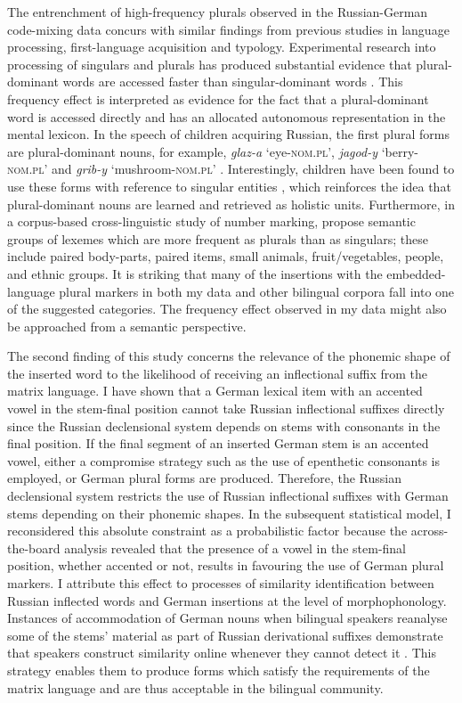 The entrenchment of high-frequency plurals observed in the Russian-German code-mixing data concurs with similar findings from previous studies in language processing, first-language acquisition and typology. Experimental research into processing of singulars and plurals has produced substantial evidence that plural-dominant words are accessed faster than singular-dominant words \citep{new-etal-2004,sereno-jongman-1997,baayen-dijkstra-schreuder}. This frequency effect is interpreted as evidence for the fact that a plural-dominant word is accessed directly and has an allocated autonomous representation in the mental lexicon. In the speech of children acquiring Russian, the first plural forms are plural-dominant nouns, for example, \textit{glaz-a} `eye-\textsc{nom.pl}', \textit{jagod-y} `berry-\textsc{nom.pl}' and \textit{grib-y} `mushroom-\textsc{nom.pl}' \citep[198]{gagarina-voeikova}. Interestingly, children have been found to use these forms with reference to singular entities \citep[91]{ceitlin}, which reinforces the idea that plural-dominant nouns are learned and retrieved as holistic units. Furthermore, in a corpus-based cross-linguistic study of number marking, \citet{haspelmath-karjus} propose semantic groups of lexemes which are more frequent as plurals than as singulars; these include paired body-parts, paired items, small animals, fruit/vegetables, people, and ethnic groups. It is striking that many of the insertions with the embedded-language plural markers in both my data and other bilingual corpora fall into one of the suggested categories. The frequency effect observed in my data might also be approached from a semantic perspective.

The second finding of this study concerns the relevance of the phonemic shape of the inserted word to the likelihood of receiving an inflectional suffix from the matrix language. I have shown that a German lexical item with an accented vowel in the stem-final position cannot take Russian inflectional suffixes directly since the Russian declensional system depends on stems with consonants in the final position. If the final segment of an inserted German stem is an accented vowel, either a compromise strategy such as the use of epenthetic consonants is employed, or German plural forms are produced. Therefore, the Russian declensional system restricts the use of Russian inflectional suffixes with German stems depending on their phonemic shapes. In the subsequent statistical model, I reconsidered this absolute constraint as a probabilistic factor because the across-the-board analysis revealed that the presence of a vowel in the stem-final position, whether accented or not, results in favouring the use of German plural markers. I attribute this effect to processes of similarity identification between Russian inflected words and German insertions at the level of morphophonology. Instances of accommodation of German nouns when bilingual speakers reanalyse some of the stems' material as part of Russian derivational suffixes demonstrate that speakers construct similarity online whenever they cannot detect it \citep[cf.][]{hakimov-backus-20-intro}. This strategy enables them to produce forms which satisfy the requirements of the matrix language and are thus acceptable in the bilingual community.


